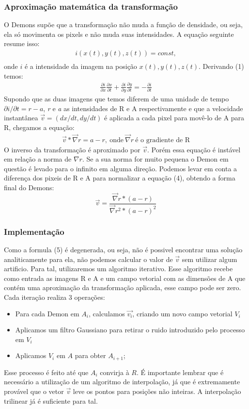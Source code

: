 \documentclass[]{spie}  %
\begin{document}
\subsubsection{Aproximação matemática da transformação}
	O Demons supõe que a transformação não muda a função de densidade, ou seja, ela só movimenta os pixels e não muda
suas intensidades. A equação seguinte resume isso:
\begin{align}
	i(x(t),y(t),z(t)) = const, \\
\end{align}
	onde $i$ é a intensidade da imagem na posição $x(t),y(t),z(t)$. Derivando (1) temos:
\begin{align}
	\frac{\partial i}{\partial x} \frac{\partial x}{\partial t} +
	\frac{\partial i}{\partial y} \frac{\partial y}{\partial t} = - \frac{\partial i}{\partial t}
\end{align}
	Supondo que as duas imagens que temos diferem de uma unidade de tempo $\partial i/\partial t = 
r-a$, \textit{r} e \textit{a} as intensidades de R e A respectivamente e que a velocidade instantânea 
$\vec{v} = (dx/dt,dy/dt)$ é aplicada a cada pixel para movê-lo de A para R, chegamos a equação:
\begin{align}
	\vec{v}*\vec{\nabla}r = a - r, \ \text{onde} \ \vec{\nabla} r \ \text{é o gradiente de R}
\end{align}
	O inverso da transformação é aproximado por $\vec{v}$. Porém essa equação é instável em relação a norma de $\nabla 
r$. Se a sua norma for muito pequena o Demon em questão é levado para o infinito em alguma direção. Podemos levar em 
conta a diferença dos pixeis de R e A para normalizar a equação (4), obtendo a forma final do Demons:
\begin{equation}
	\vec{v} = \frac{\vec{\nabla}r * (a - r)}{\vec{\nabla}r^2 * (a - r)^2}
\end{equation}

\subsubsection{Implementação}
	Como a formula (5) é degenerada, ou seja, não é possivel encontrar uma solução analiticamente para ela,
não podemos calcular o valor de $\vec{v}$ sem utilizar algum artificio. Para tal,
utilizaremos um algoritmo iterativo. Esse algoritmo recebe como entrada as imagens R e A e um campo vetorial
com as dimensões de A que contém uma aproximação da transformação aplicada, esse campo pode ser zero. 
Cada iteração realiza 3 operações:
\begin{itemize}
	\item Para cada Demon em $A_i$, calculamos $\vec{v_i}$, criando um novo campo vetorial $V_i$
	\item Aplicamos um filtro Gaussiano para retirar o ruido introduzido pelo processo em $V_i$
	\item Aplicamos $V_i$ em $A$ para obter $A_{i+1}$;
\end{itemize}
	Esse processo é feito até que $A_i$ convirja à $R$. É importante lembrar que é necessário a
utilização de um algoritmo de interpolação, já que é extremamente provável que o vetor $\vec{v}$
leve os pontos para posições não inteiras. A interpolação trilinear já é suficiente para tal.
\end{document}
